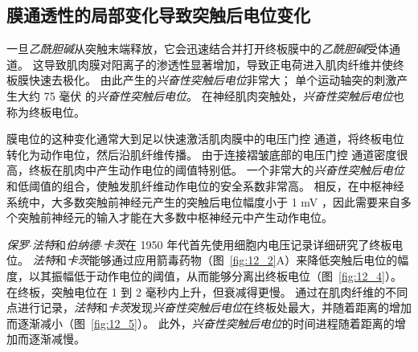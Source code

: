 \subsection{膜通透性的局部变化导致突触后电位变化}

一旦\textit{乙酰胆碱}从突触末端释放，它会迅速结合并打开终板膜中的\textit{乙酰胆碱}受体通道。
这导致肌肉膜对阳离子的渗透性显著增加，导致正电荷进入肌肉纤维并使终板膜快速去极化。
由此产生的\textit{兴奋性突触后电位}非常大；
单个运动轴突的刺激产生大约 75 毫伏 的\textit{兴奋性突触后电位}。
在神经肌肉突触处，\textit{兴奋性突触后电位}也称为终板电位。


膜电位的这种变化通常大到足以快速激活肌肉膜中的电压门控  通道，将终板电位转化为动作电位，然后沿肌纤维传播。
由于连接褶皱底部的电压门控  通道密度很高，终板在肌肉中产生动作电位的阈值特别低。
一个非常大的\textit{兴奋性突触后电位}和低阈值的组合，使触发肌纤维动作电位的安全系数非常高。
相反，在中枢神经系统中，大多数突触前神经元产生的突触后电位幅度小于 1 mV ，因此需要来自多个突触前神经元的输入才能在大多数中枢神经元中产生动作电位。


\textit{保罗$\cdot$法特}和\textit{伯纳德$\cdot$卡茨}在 1950 年代首先使用细胞内电压记录详细研究了终板电位。
\textit{法特}和\textit{卡茨}能够通过应用箭毒药物（图~\ref{fig:12_2}A）来降低突触后电位的幅度，以其振幅低于动作电位的阈值，从而能够分离出终板电位（图~\ref{fig:12_4}）。
在终板，突触电位在 1 到 2 毫秒内上升，但衰减得更慢。
通过在肌肉纤维的不同点进行记录，\textit{法特}和\textit{卡茨}发现\textit{兴奋性突触后电位}在终板处最大，并随着距离的增加而逐渐减小（图~\ref{fig:12_5}）。
此外，\textit{兴奋性突触后电位}的时间进程随着距离的增加而逐渐减慢。


